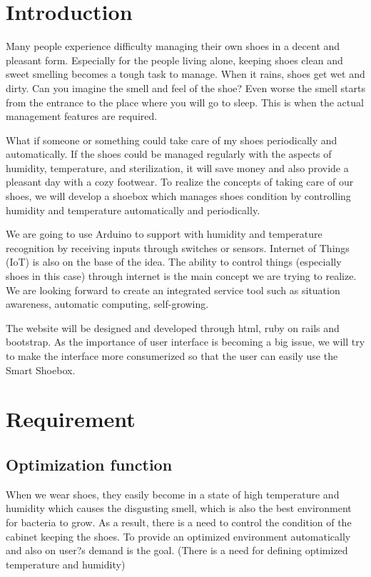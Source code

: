 \documentclass[conference]{IEEEtran}
\begin{document}
\section{Introduction}
Many people experience difficulty managing their own shoes in a decent and pleasant form. Especially for the people living alone, keeping shoes clean and sweet smelling becomes a tough task to manage. When it rains, shoes get wet and dirty. Can you imagine the smell and feel of the shoe? Even worse the smell starts from the entrance to the place where you will go to sleep. This is when the actual management features are required.

What if someone or something could take care of my shoes periodically and automatically. If the shoes could be managed regularly with the aspects of humidity, temperature, and sterilization, it will save money and also provide a pleasant day with a cozy footwear. To realize the concepts of taking care of our shoes, we will develop a shoebox which manages shoes condition by controlling humidity and temperature automatically and periodically. 

We are going to use Arduino to support with humidity and temperature recognition by receiving inputs through switches or sensors. Internet of Things (IoT) is also on the base of the idea. The ability to control things (especially shoes in this case) through internet is the main concept we are trying to realize. We are looking forward to create an integrated service tool such as situation awareness, automatic computing, self-growing. 

The website will be designed and developed through html, ruby on rails and bootstrap. As the importance of user interface is becoming a big issue, we will try to make the interface more consumerized so that the user can easily use the Smart Shoebox.\\


\section{Requirement}

\subsection{Optimization function}
When we wear shoes, they easily become in a state of high temperature and humidity which causes the disgusting smell, which is also the best environment for bacteria to grow. As a result, there is a need to control the condition of the cabinet keeping the shoes. To provide an optimized environment automatically and also on user?s demand is the goal. (There is a need for defining optimized temperature and humidity)
\end{document}
